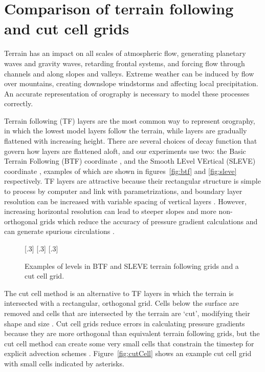 \documentclass[a4paper]{article}
\begin{document}
\section{Comparison of terrain following and cut cell grids}
Terrain has an impact on all scales of atmospheric flow, generating planetary waves and gravity waves, retarding frontal systems, and forcing flow through channels and along slopes and valleys.  Extreme weather can be induced by flow over mountains, creating downslope windstorms and affecting local precipitation.  An accurate representation of orography is necessary to model these processes correctly.

Terrain following (TF) layers are the most common way to represent orography, in which the lowest model layers follow the terrain, while layers are gradually flattened with increasing height.  There are several choices of decay function that govern how layers are flattened aloft, and our experiments use two: the Basic Terrain Following (BTF) coordinate \citep{galchen-somerville1975}, and the Smooth LEvel VErtical (SLEVE) coordinate \citep{schaer2002}, examples of which are shown in figures~\ref{fig:btf} and \ref{fig:sleve} respectively.  TF layers are attractive because their rectangular structure is simple to process by computer and link with parametrizations, and boundary layer resolution can be increased with variable spacing of vertical layers \citep{schaer2002}.
However, increasing horizontal resolution can lead to steeper slopes and more non-orthogonal grids which reduce the accuracy of pressure gradient calculations and can generate spurious circulations \citep{dempsey-davis1998,klemp2011}.

\begin{figure}
	\centering
	\footnotesize
	[.3\linewidth]{}
	[.3\linewidth]{}
	[.3\linewidth]{}
%
	\caption{Examples of levels in BTF and SLEVE terrain following grids and a cut cell grid.}
	\label{fig:grids}
\end{figure}

The cut cell method is an alternative to TF layers in which the terrain is intersected with a rectangular, orthogonal grid.  Cells below the surface are removed and cells that are intersected by the terrain are `cut', modifying their shape and size \citep{adcroft1997}.  Cut cell grids reduce errors in calculating pressure gradients because they are more orthogonal than equivalent terrain following grids, but the cut cell method can create some very small cells that constrain the timestep for explicit advection schemes \citep{klein2009}.  Figure~\ref{fig:cutCell} shows an example cut cell grid with small cells indicated by asterisks.
\end{document}
